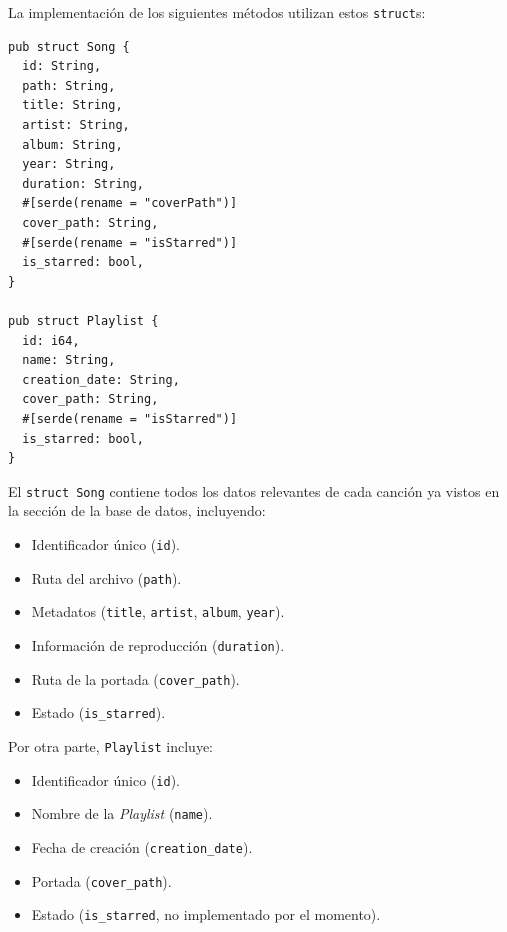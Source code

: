 \documentclass[11pt, a4paper]{article}
\begin{document}
            La implementación de los siguientes métodos utilizan estos \texttt{struct}s:

            \begin{lstlisting}[caption={structs Song y Playlist}]
pub struct Song {
  id: String,
  path: String,
  title: String,
  artist: String,
  album: String,
  year: String,
  duration: String,
  #[serde(rename = "coverPath")]
  cover_path: String,
  #[serde(rename = "isStarred")]
  is_starred: bool,
}

pub struct Playlist {
  id: i64,
  name: String,
  creation_date: String,
  cover_path: String,
  #[serde(rename = "isStarred")]
  is_starred: bool,
}
            \end{lstlisting} \newpage

            El \texttt{struct Song} contiene todos los datos relevantes de cada canción ya vistos en la sección de la base de datos, incluyendo:

            \begin{itemize}
              \item Identificador único (\texttt{id}).
              \item Ruta del archivo (\texttt{path}).
              \item Metadatos (\texttt{title}, \texttt{artist}, \texttt{album}, \texttt{year}).
              \item Información de reproducción (\texttt{duration}).
              \item Ruta de la portada (\texttt{cover\_path}).
              \item Estado (\texttt{is\_starred}).
            \end{itemize}

            Por otra parte, \texttt{Playlist} incluye:

            \begin{itemize}
              \item Identificador único (\texttt{id}).
              \item Nombre de la \textit{Playlist} (\texttt{name}).
              \item Fecha de creación (\texttt{creation\_date}).
              \item Portada (\texttt{cover\_path}).
              \item Estado (\texttt{is\_starred}, no implementado por el momento).
            \end{itemize}
\end{document}
